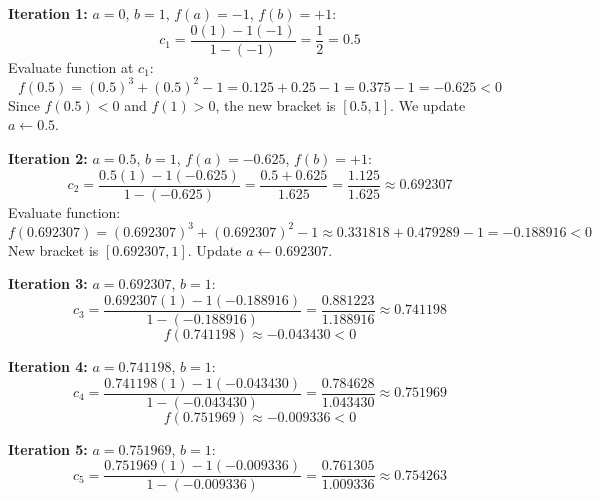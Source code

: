 \begin{examplebox}[Step-by-Step Regula-Falsi Iterations for $f(x) = x^3 + x^2 - 1 = 0$]
\textbf{Iteration 1:} $a = 0$, $b = 1$, $f(a) = -1$, $f(b) = +1$:
\begin{equation}
    c_1 = \frac{0(1) - 1(-1)}{1 - (-1)} = \frac{1}{2} = 0.5
\end{equation}
Evaluate function at $c_1$:
\begin{equation}
    f(0.5) = (0.5)^3 + (0.5)^2 - 1 = 0.125 + 0.25 - 1 = 0.375 - 1 = -0.625 < 0
\end{equation}
Since $f(0.5) < 0$ and $f(1) > 0$, the new bracket is $[0.5, 1]$. We update $a \leftarrow 0.5$.

\textbf{Iteration 2:} $a = 0.5$, $b = 1$, $f(a) = -0.625$, $f(b) = +1$:
\begin{equation}
    c_2 = \frac{0.5(1) - 1(-0.625)}{1 - (-0.625)} = \frac{0.5 + 0.625}{1.625} = \frac{1.125}{1.625} \approx 0.692307
\end{equation}
Evaluate function:
\begin{equation}
    f(0.692307) = (0.692307)^3 + (0.692307)^2 - 1 \approx 0.331818 + 0.479289 - 1 = -0.188916 < 0
\end{equation}
New bracket is $[0.692307, 1]$. Update $a \leftarrow 0.692307$.

\textbf{Iteration 3:} $a = 0.692307$, $b = 1$:
\begin{equation}
    c_3 = \frac{0.692307(1) - 1(-0.188916)}{1 - (-0.188916)} = \frac{0.881223}{1.188916} \approx 0.741198
\end{equation}
\begin{equation}
    f(0.741198) \approx -0.043430 < 0
\end{equation}

\textbf{Iteration 4:} $a = 0.741198$, $b = 1$:
\begin{equation}
    c_4 = \frac{0.741198(1) - 1(-0.043430)}{1 - (-0.043430)} = \frac{0.784628}{1.043430} \approx 0.751969
\end{equation}
\begin{equation}
    f(0.751969) \approx -0.009336 < 0
\end{equation}

\textbf{Iteration 5:} $a = 0.751969$, $b = 1$:
\begin{equation}
    c_5 = \frac{0.751969(1) - 1(-0.009336)}{1 - (-0.009336)} = \frac{0.761305}{1.009336} \approx 0.754263
\end{equation}


\end{examplebox}
